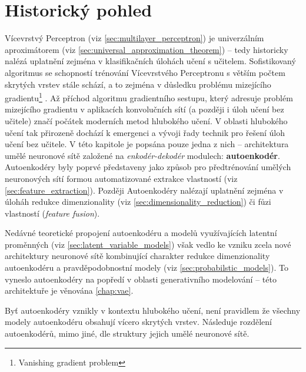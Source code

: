 \section{Historický pohled}
Vícevrstvý Perceptron (viz \autoref{sec:multilayer_perceptron}) je univerzálním aproximátorem (viz \autoref{sec:universal_approximation_theorem}) – tedy historicky nalézá uplatnění zejména v klasifikačních úlohách učení s učitelem.
Sofistikovaný algoritmus se schopností trénování Vícevrstvého Perceptronu s větším počtem skrytých vrstev stále schází, a to zejména v důsledku problému mizejícího gradientu\footnote{Vanishing gradient problem} \cite{Hochreiter1998}.
Až příchod algoritmu gradientního sestupu, který adresuje problém mizejícího gradientu v aplikacích konvolučních sítí \cite{LeCun1989} (a později i úloh učení bez učitele) značí počátek moderních metod hlubokého učení.
V oblasti hlubokého učení tak přirozeně dochází k emergenci a vývoji řady technik pro řešení úloh učení bez učitele.
V této kapitole je popsána pouze jedna z nich – architektura umělé neuronové sítě založené na \emph{enkodér-dekodér} modulech: \textbf{autoenkodér}.
Autoenkodéry byly poprvé představeny jako způsob pro předtrénování umělých neuronových sítí formou automatizované extrakce vlastností (viz \autoref{sec:feature_extraction}). 
Později Autoenkodéry nalézají uplatnění zejména v úloháh redukce dimenzionality (viz \autoref{sec:dimensionality_reduction}) či fůzi vlastností (\emph{feature fusion}). \cite{Charte2018}


Nedávné teoretické propojení autoenkodéru a modelů využívajících latentní proměnných (viz \autoref{sec:latent_variable_models}) však vedlo ke vzniku zcela nové architektury neuronové sítě kombinující charakter redukce dimenzionality autoenkodéru a pravděpodobnostní modely (viz \autoref{sec:probabilstic_models}).
To vyneslo autoenkodéry na popředí v oblasti generativního modelování – této architektuře je věnována \autoref{chap:vae}.

Byť autoenkodéry vznikly v kontextu hlubokého učení, není pravidlem že všechny modely autoenkodéru obsahují vícero skrytých vrstev. Následuje rozdělení autoenkodérů, mimo jiné, dle struktury jejich umělé neuronové sítě.
